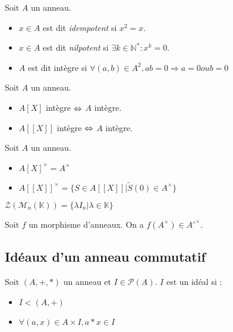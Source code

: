 \begin{defi} Soit $A$ un anneau. \begin{itemize}
    \item $x\in A$ est dit \emph{idempotent} si $x^2=x$.
    \item $x\in A$ est dit \emph{nilpotent} si $\exists k\in\mathbb{N}^*:x^k=0$.
    \item $A$ est dit intègre si $\forall (a,b)\in A^2, ab=0 \Rightarrow a = 0 ou b = 0$
\end{itemize}\end{defi}

\begin{prop} Soit $A$ un anneau.\begin{itemize}
    \item $A[X]$ intègre $\Leftrightarrow$ $A$ intègre.
    \item $A[[X]]$ intègre $\Leftrightarrow$ $A$ intègre.
\end{itemize}\end{prop}

\begin{prop} Soit $A$ un anneau.\begin{itemize}
    \item $A[X]^\times = A^\times$
    \item $A[[X]]^\times = \{S\in A[[X]] | \tilde{S}(0)\in A^\times\}$
\end{itemize}\end{prop}

\begin{prop} $\mathscr{Z}(\mathscr{M}_n(\mathbb{K})) = \{\lambda I_n | \lambda\in\mathbb{K}\}$
\end{prop}

\begin{lemme} Soit $f$ un morphisme d'anneaux. On a $f(A^\times)\in A'^\times$.
\end{lemme}

\subsection{Idéaux d'un anneau commutatif}
\begin{defi} Soit $(A,+,*)$ un anneau et $I\in\mathscr{P}(A)$. $I$ est un idéal si : \begin{itemize}
    \item $I<(A,+)$
    \item $\forall(a,x)\in A\times I, a*x\in I$
\end{itemize}\end{defi}

